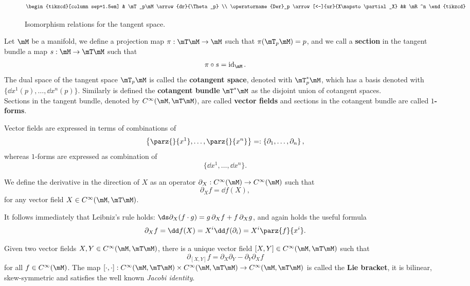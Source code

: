 \begin{figure}
	\centering
	\[
	\begin{tikzcd}[column sep=1.5em]
	& \mT_p\mM \arrow{dr}{\Theta_p} \\
	\operatorname{Der}_p \arrow[<-]{ur}{X\mapsto \partial_X} && \mR^n
	\end{tikzcd}
	\]
	\caption{Isomorphism relations for the tangent space.}
\end{figure}






\begin{definition}
	Let $\mM$ be a manifold, we define a projection map $\pi:\mT\mM\to\mM$ such that $\pi(\mT_p\mM)=p$, and we call a \textbf{section} in the tangent bundle a map $s:\mM\to\mT\mM$ such that
	\[\pi\circ s=\operatorname{id}_\mM.\]
	The dual space of the tangent space $\mT_p\mM$ is called the \textbf{cotangent space}, denoted with $\mT^*_p\mM$, which has a basis denoted with $\{\dd x^1(p),\dots,\dd x^n(p)\}$. Similarly is defined the \textbf{cotangent bundle} $\mT^*\mM$ as the disjoint union of cotangent spaces.\\
	Sections in the tangent bundle, denoted by $C^\infty(\mM,\mT\mM)$, are called \textbf{vector fields} and sections in the cotangent bundle are called \textbf{$1$-forms}.
\end{definition}

Vector fields are expressed in terms of combinations of \[\left\{  \parz{ }{x^1},\dots,\parz{ }{x^n}    \right\}=:\left\{\partial_1,\dots,\partial_n\right\},\]
whereas $1$-forms are expressed as combination of
$$\{\dd x^1,\dots,\dd x^n\}.$$




\begin{definition}
We define the derivative in the direction of $X$ as an operator $\partial_X:C^\infty(\mM)\to C^\infty(\mM)$ such that
	\[ \partial_X f=\dd f(X), \]
for any vector field $X\in C^\infty(\mM,\mT\mM)$.
\end{definition}
It follows immediately that Leibniz's rule holds: $\ds \partial_X (f\cdot g)=g\,\partial_Xf +f\,\partial_X g$, and again holds the useful formula
\[	\partial_X f=\dd f(X)=X^i\dd f(\partial_i)=X^i\parz{f}{x^i}.	\]

\begin{oss}
	Given two vector fields $X,Y\in C^\infty(\mM,\mT\mM)$, there is a unique vector field $[X,Y]\in C^\infty(\mM,\mT\mM)$ such that
	\[		\partial_{[X,Y]}f=\partial_X\partial_Y-\partial_Y\partial_X f \]
	for all $f\in C^\infty(\mM)$. The map $[\cdot,\cdot ]:C^\infty(\mM,\mT\mM)\times C^\infty(\mM,\mT\mM)\to C^\infty(\mM,\mT\mM)$ is called the \textbf{Lie bracket}, it is bilinear, skew-symmetric and satisfies the well known \emph{Jacobi identity}.
\end{oss}

